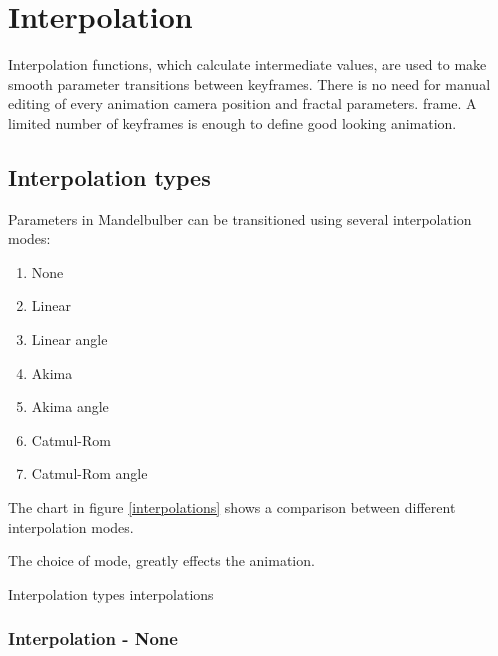 \section{Interpolation}\label{interpolation}

Interpolation functions, which calculate intermediate values, are used to make smooth parameter transitions between keyframes. There is no need for manual editing of every animation camera position and fractal parameters. 
frame. A limited number of keyframes is enough to define good looking animation.

\subsection{Interpolation types}\label{interpolation-types}

Parameters in Mandelbulber can be transitioned using several interpolation modes:

\begin{multicols}{3}
\begin{enumerate}
	
	\item None

	\item Linear

	\item Linear angle
	
	\item Akima	

	\item Akima angle
	
	\item Catmul-Rom

	\item Catmul-Rom angle
	
\end{enumerate}
\end{multicols}

The chart in figure \ref{interpolations} shows a comparison between different interpolation modes.

The choice of mode, greatly effects the animation.

{Interpolation types}
{interpolations}

\subsubsection{Interpolation - None}\label{interpolation-none}

